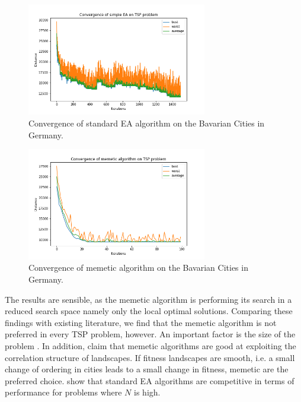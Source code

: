 \documentclass{article}
\begin{document}
\begin{enumerate}[label=\alph*)]
    
    \begin{figure}[H]
        \centering
        \includegraphics[width=0.7\textwidth]{Assignment 1/Figures/A1_6c1.png}
        \caption{Convergence of standard EA algorithm on the Bavarian Cities in Germany. }
        \label{fig:A1_6c1}
    \end{figure}  
    \begin{figure}[H]
        \centering
        \includegraphics[width=0.7\textwidth]{Assignment 1/Figures/A1_6c2.png}
        \caption{Convergence of memetic algorithm on the Bavarian Cities in Germany. }
        \label{fig:A1_6c2}
    \end{figure}
    
    The results are sensible, as the memetic algorithm is performing its search in a reduced search space namely only the local optimal solutions.  Comparing these findings with existing literature, we find that the memetic algorithm is not preferred in every TSP problem, however. An important factor is the size of the problem  \cite{merz2001memetic}. In addition, \cite{merz2001memetic} claim that memetic algorithms are good at exploiting the correlation structure of landscapes. If fitness landscapes are smooth, i.e. a small change of ordering in cities leads to a small change in fitness, memetic are the preferred choice.
     show that standard EA algorithms are competitive in terms of performance for problems where $N$ is high. 
\end{enumerate}
\end{document}

